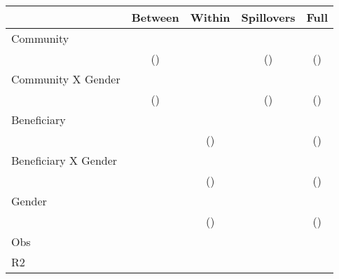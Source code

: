 
\begin{tabular}{l*{4}{c}}\hline&\multicolumn{1}{c}{Between}&\multicolumn{1}{c}{Within}&\multicolumn{1}{c}{Spillovers}&\multicolumn{1}{c}{Full}\\ \hline
 Community                                     &             &                                               &  &                              \\ 
                                                       &        ()           &                                       &       ()     &      ()                                           \\ 
 Community X Gender            &             &                                               &  &                              \\ 
                                                       &        ()           &                                       &       ()     &      ()                                           \\ 
 Beneficiary                           &                                               &     &                                &                                  \\ 
                                                       &                                               & ()                  &                                        &      ()                                           \\ 
 Beneficiary X Gender          &                                               &     &                                &                                  \\ 
                                                       &                                               & ()                  &                                        &      ()                                           \\ 
 Gender                                        &                              &     &                                &                                  \\ 
                                                       &                                               & ()                  &                                        &      ()                                           \\ 
\hline                                                                                                                                                                                                                                            
 Obs                   &                              &                              &                       &                                                             \\ 
 R2                    &                             &                             &                      &                                                            \\ 
\hline \end{tabular}                                                                                                                                                                                                              